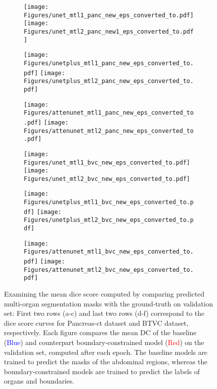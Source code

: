 \documentclass[final,5p,times,twocolumn]{elsarticle}
\begin{document}
\begin{figure*}[!hbt]
\captionsetup[subfigure]{justification=centering}
\centering
{}\begin{subfigure}{.3\textwidth}
\centering
\texttt{[image: Figures/unet\_mtl1\_panc\_new\_eps\_converted\_to.pdf]} 
\hfill
\texttt{[image: Figures/unet\_mtl2\_panc\_new1\_eps\_converted\_to.pdf]}
\caption{}
\label{fig:sub20}
\end{subfigure}\begin{subfigure}{.3\textwidth}
\centering
\texttt{[image: Figures/unetplus\_mtl1\_panc\_new\_eps\_converted\_to.pdf]}
\hfill
\texttt{[image: Figures/unetplus\_mtl2\_panc\_new\_eps\_converted\_to.pdf]}
\caption{}
\label{fig:sub21}
\end{subfigure}\begin{subfigure}{.3\textwidth}
\centering
\texttt{[image: Figures/attenunet\_mtl1\_panc\_new\_eps\_converted\_to.pdf]}
\hfill
\texttt{[image: Figures/attenunet\_mtl2\_panc\_new\_eps\_converted\_to.pdf]} 
\caption{}
\label{fig:sub22}
\end{subfigure}
\begin{subfigure}{.3\textwidth}
\centering
\texttt{[image: Figures/unet\_mtl1\_bvc\_new\_eps\_converted\_to.pdf]}
\hfill
\texttt{[image: Figures/unet\_mtl2\_bvc\_new\_eps\_converted\_to.pdf]}
\caption{}
\label{fig:sub23}
\end{subfigure}\begin{subfigure}{.3\textwidth}
\centering
\texttt{[image: Figures/unetplus\_mtl1\_bvc\_new\_eps\_converted\_to.pdf]}
\hfill
\texttt{[image: Figures/unetplus\_mtl2\_bvc\_new\_eps\_converted\_to.pdf]}
\caption{}
\label{fig:sub24}
\end{subfigure}
\begin{subfigure}{.3\textwidth}
\centering
\texttt{[image: Figures/attenunet\_mtl1\_bvc\_new\_eps\_converted\_to.pdf]}
\hfill
\texttt{[image: Figures/attenunet\_mtl2\_bvc\_new\_eps\_converted\_to.pdf]}
\caption{}
\label{fig:sub25}
\end{subfigure}
\caption{Examining the mean dice score computed by comparing predicted multi-organ segmentation masks with the ground-truth on validation set: First two rows (a-c) and last two rows (d-f) correspond to the dice score curves for Pancreas-ct dataset and BTVC dataset, respectively. Each figure compares the mean DC of the baseline (\textcolor{blue}{Blue}) and counterpart boundary-constrained model (\textcolor{red}{Red}) on the validation set, computed after each epoch. The baseline models are trained to predict the masks of the abdominal regions, whereas the boundary-constrained models are trained to predict the labels of organs and boundaries.}
\label{fig:valcurve}
\end{figure*}
\end{document}
